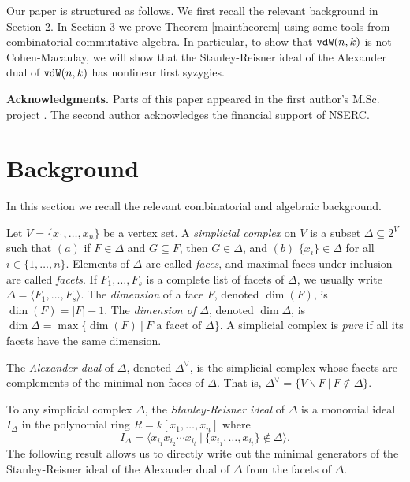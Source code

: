 \documentclass[12pt]{amsart}
\numberwithin{equation}{section}
\theoremstyle{definition}
\begin{document}
Our paper is structured as follows.  We first
recall the relevant background in Section 2.  In Section 3
we prove Theorem \ref{maintheorem} 
using some tools from combinatorial commutative algebra.
In particular, to show that ${\tt vdW}(n,k)$ is not
Cohen-Macaulay, we will 
show that the Stanley-Reisner ideal of the Alexander dual of 
${\tt vdW}(n,k)$ has nonlinear first syzygies.

\noindent
{\bf Acknowledgments.} 
Parts of this paper appeared in the first author's M.Sc. project \cite{H}.  
The second author acknowledges the financial support of NSERC.


\section{Background}

In this section we recall the relevant combinatorial
and algebraic background.

Let $V = \{x_1,\ldots,x_n\}$ be a vertex set.  A {\it simplicial complex}
on $V$ is a subset $\Delta \subseteq 2^{V}$ such that $(a)$ if $F \in
\Delta$ and $G \subseteq F$, then $G \in \Delta$, and $(b)$ $\{x_i\} \in \Delta$
for all $i \in \{1,\ldots,n\}$.  Elements of $\Delta$ are called
{\it faces}, and maximal faces under inclusion are called {\it facets}.
If $F_1,\ldots,F_s$ is a complete list of facets of $\Delta$, we usually
write $\Delta = \langle F_1,\ldots,F_s \rangle$.   The {\it dimension}
of a face $F$, denoted $\dim(F)$, is $\dim(F) = |F|-1$.  The {\it dimension
of $\Delta$}, denoted $\dim \Delta$, is $\dim \Delta = \max\{\dim(F) ~|~
\mbox{$F$ a facet of $\Delta$}\}$.  A simplicial complex is 
{\it pure} if all its facets have the same dimension.

The {\it Alexander dual} of $\Delta$, denoted $\Delta^\vee$, is 
the simplicial complex whose facets are complements of the minimal 
non-faces of $\Delta$. That is,
$
\Delta^\vee = \{ V\backslash F ~|~  F\notin\Delta \}.
$

To any simplicial complex $\Delta$, the {\it Stanley-Reisner ideal}
of $\Delta$ is a monomial ideal $I_\Delta$ in the polynomial
ring $R = k[x_1,\ldots,x_n]$ where 
\[I_{\Delta} = \langle x_{i_1}x_{i_2}\cdots x_{i_t} ~|~ \{x_{i_1},\ldots,x_{i_t}\} 
\not\in \Delta \rangle.\]
The following result allows us to directly write out the minimal generators
of the Stanley-Reisner ideal of the Alexander dual of $\Delta$
from the facets of $\Delta$.
\end{document}
